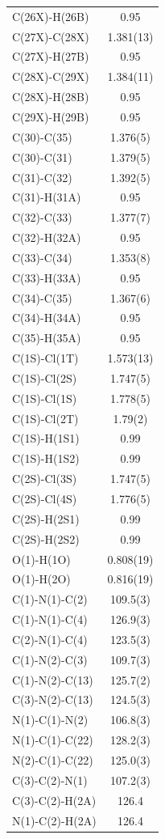 \begin{center}
{\begin{supertabular}{p{1.5in}c}
C(26X)-H(26B) &0.95\\
C(27X)-C(28X) &1.381(13)\\
C(27X)-H(27B) &0.95\\
C(28X)-C(29X) &1.384(11)\\
C(28X)-H(28B) &0.95\\
C(29X)-H(29B) &0.95\\
C(30)-C(35) &1.376(5)\\
C(30)-C(31) &1.379(5)\\
C(31)-C(32) &1.392(5)\\
C(31)-H(31A) &0.95\\
C(32)-C(33) &1.377(7)\\
C(32)-H(32A) &0.95\\
C(33)-C(34) &1.353(8)\\
C(33)-H(33A) &0.95\\
C(34)-C(35) &1.367(6)\\
C(34)-H(34A) &0.95\\
C(35)-H(35A) &0.95\\
C(1S)-Cl(1T) &1.573(13)\\
C(1S)-Cl(2S) &1.747(5)\\
C(1S)-Cl(1S) &1.778(5)\\
C(1S)-Cl(2T) &1.79(2)\\
C(1S)-H(1S1) &0.99\\
C(1S)-H(1S2) &0.99\\
C(2S)-Cl(3S) &1.747(5)\\
C(2S)-Cl(4S) &1.776(5)\\
C(2S)-H(2S1) &0.99\\
C(2S)-H(2S2) &0.99\\
O(1)-H(1O) &0.808(19)\\
O(1)-H(2O) &0.816(19)\\
C(1)-N(1)-C(2)&109.5(3)\\
C(1)-N(1)-C(4)&126.9(3)\\
C(2)-N(1)-C(4)&123.5(3)\\
C(1)-N(2)-C(3)&109.7(3)\\
C(1)-N(2)-C(13)&125.7(2)\\
C(3)-N(2)-C(13)&124.5(3)\\
N(1)-C(1)-N(2)&106.8(3)\\
N(1)-C(1)-C(22)&128.2(3)\\
N(2)-C(1)-C(22)&125.0(3)\\
C(3)-C(2)-N(1)&107.2(3)\\
C(3)-C(2)-H(2A)&126.4\\
N(1)-C(2)-H(2A)&126.4\\

\end{supertabular}}
\end{center}
